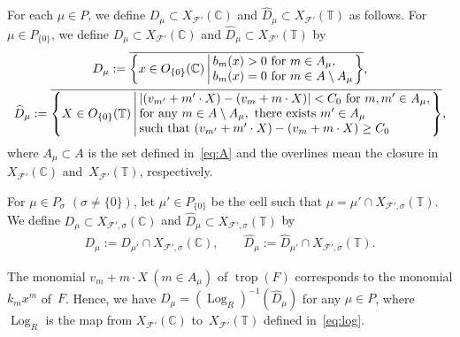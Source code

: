 \documentclass[10pt,a4paper]{amsart}
\numberwithin{equation}{section}
\begin{document}
\begin{Definition}\label{df:nbd} For each $\mu \in P$, we def\/ine $D_\mu \subset X_{{\mathcal F}'}({\mathbb C})$ and $\widehat{D}_\mu \subset X_{{\mathcal F}'}({\mathbb T})$ as follows. For $\mu \in P_{\{0\}}$, we def\/ine $D_\mu \subset X_{{\mathcal F}'}({\mathbb C})$ and $\widehat{D}_\mu \subset X_{{\mathcal F}'}({\mathbb T})$ by
\begin{gather*}
D_\mu:=
\overline{
\left\{ x \in O_{\{0\}}({\mathbb C}) \left|\,
\begin{array}{@{}l@{}}
b_{m}(x)>0\ {\rm for\ } m \in A_\mu, \\
b_{m}(x)=0\ {\rm for\ } m \in A \setminus A_\mu\\
\end{array}
\right.\right\}
},\\
\widehat{D}_\mu:=
\overline{
\left\{ X \in O_{\{0\}}({\mathbb T}) \left|\,
\begin{array}{@{}l@{}}
|(v_{m'}+m' \cdot X)-(v_{m}+m \cdot X)| < C_0\ {\rm for\ } m, m' \in A_\mu,\\
{\rm for\ any\ } m \in A \setminus A_\mu, {\rm \ there\ exists\ } m' \in A_\mu \\
{\rm such\ that\ } (v_{m'}+m' \cdot X)-(v_{m}+m \cdot X) \geq C_0 \\
\end{array}
\right.\right\}},
\end{gather*}
where $A_\mu \subset A$ is the set def\/ined in~\eqref{eq:A} and the overlines mean the closure in $X_{{\mathcal F}'}({\mathbb C})$ and~$X_{{\mathcal F}'}({\mathbb T})$, respectively.

For $\mu \in P_\sigma$ $(\sigma \neq \{0\})$, let $\mu' \in P_{\{0\}}$ be the cell such that $\mu = \mu' \cap X_{{\mathcal F}',\sigma}({\mathbb T})$. We def\/ine $D_\mu \subset X_{{\mathcal F}',\sigma}({\mathbb C})$ and $\widehat{D}_\mu \subset X_{{\mathcal F}',\sigma}({\mathbb T})$ by
\begin{gather}\label{eq:D}
D_\mu :=D_{\mu'} \cap X_{{\mathcal F}',\sigma}({\mathbb C}), \qquad \widehat{D}_\mu :=\widehat{D}_{\mu'} \cap X_{{\mathcal F}',\sigma}({\mathbb T}).
\end{gather}
\end{Definition}

The monomial $v_{m}+m \cdot X\ (m \in A_\mu)$ of $\operatorname{trop}(F)$ corresponds to the monomial $k_{m}x^{m}$ of~$F$. Hence, we have $D_\mu=(\operatorname{Log}_R)^{-1}(\widehat{D}_\mu)$ for any $\mu \in P$, where $\operatorname{Log}_R$ is the map from $X_{{\mathcal F}'}({\mathbb C})$ to~$X_{{\mathcal F}'}({\mathbb T})$ def\/ined in~\eqref{eq:log}.
\end{document}
